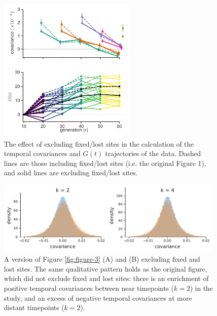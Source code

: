 \documentclass[11pt]{article}
\begin{document}
\begin{figure}[!ht]
  \centering
  \includegraphics[width=0.6\textwidth]{figures/figure-1-G-covs-nofix.pdf}

  \caption{The effect of excluding fixed/lost sites in the calculation of the
  temporal covariances and $G(t)$ trajectories of the \textcite{Barghi2019-qy}
data. Dashed lines are those including fixed/lost sites (i.e. the original
Figure 1), and solid lines are excluding fixed/lost sites.}

  \label{suppfig:supp-fig-1-nofix}
\end{figure}

\begin{figure}[!ht]
  \centering
  \includegraphics{figures/figure-3-hists-b-without-fixations.pdf}

  \caption{A version of Figure \ref{fig:figure-3} (A) and (B) excluding fixed
    and lost sites. The same qualitative pattern holds as the original figure,
    which did not exclude fixed and lost sites: there is an enrichment of
    positive temporal covariances between near timepoints ($k=2$) in the
  \textcite{Barghi2019-qy} study, and an excess of negative temporal
covariances at more distant timepoints ($k=2$). }

  \label{suppfig:supp-fig-3-nofix}
\end{figure}
\end{document}
